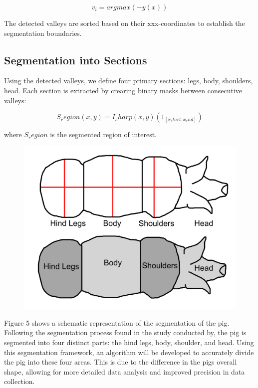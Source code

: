 {\myequation{}
\begin{equation}
	v_i=arg max(-y(x))
\end{equation}

The detected valleys are sorted based on their xxx-coordinates to establish the segmentation boundaries.

\subsection{Segmentation into Sections}
Using the detected valleys, we define four primary sections: legs, body, shoulders, head. Each section is extracted by crearing binary masks between consecutive valleys:

\myequation{}
\begin{equation}
	S_region (x,y) = I_sharp (x,y) (1_[x_start,x_end])
\end{equation}

where $S_region$ is the segmented region of interest.

\begin{figure}[h]
	\centering
	\includegraphics[height=0.4\textheight]{figures/Untitled-1 (1)}
	\caption{}
	\label{fig: Schematic representation of segmentation}
\end{figure}

Figure 5 shows a schematic representation of the segmentation of the pig. Following the segmentation process found in the study conducted by, the pig is segmented into four distinct parts: the hind legs, body, shoulder, and head. Using this segmentation framework, an algorithm will be developed to accurately divide the pig into these four areas. This is due to the difference in the pigs overall shape, allowing for more detailed data analysis and improved precision in data collection.

}
